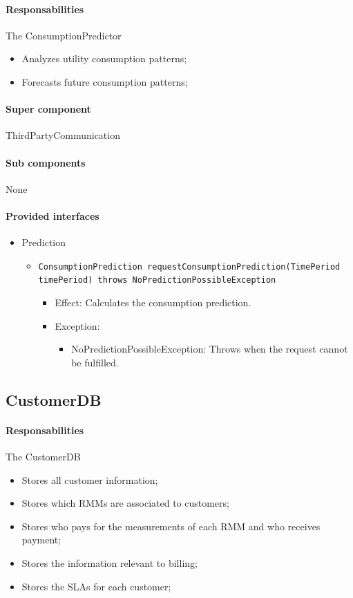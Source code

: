 \documentclass[a4paper,10pt]{article}
\begin{document}
\paragraph{Responsabilities} 
The ConsumptionPredictor
\begin{itemize}
	\item Analyzes utility consumption patterns;
    \item Forecasts future consumption patterns;
\end{itemize}

\paragraph{Super component} ThirdPartyCommunication

\paragraph{Sub components} None

\paragraph{Provided interfaces}
\begin{itemize}
	\item Prediction
    \begin{itemize}
        \item \texttt{ConsumptionPrediction requestConsumptionPrediction(TimePeriod timePeriod) throws NoPredictionPossibleException}
        \begin{itemize}
        	\item Effect: Calculates the consumption prediction.
            \item Exception:
            \begin{itemize}
            	\item NoPredictionPossibleException: Throws when the request cannot be fulfilled.
            \end{itemize}
        \end{itemize}
    \end{itemize}
\end{itemize}

\subsection{CustomerDB}
\paragraph{Responsabilities} 
The CustomerDB
\begin{itemize}
	\item Stores all customer information;
    \item Stores which RMMs are associated to customers;
    \item Stores who pays for the measurements of each RMM and who receives payment;
    \item Stores the information relevant to billing;
    \item Stores the SLAs for each customer;
\end{itemize}
\end{document}
